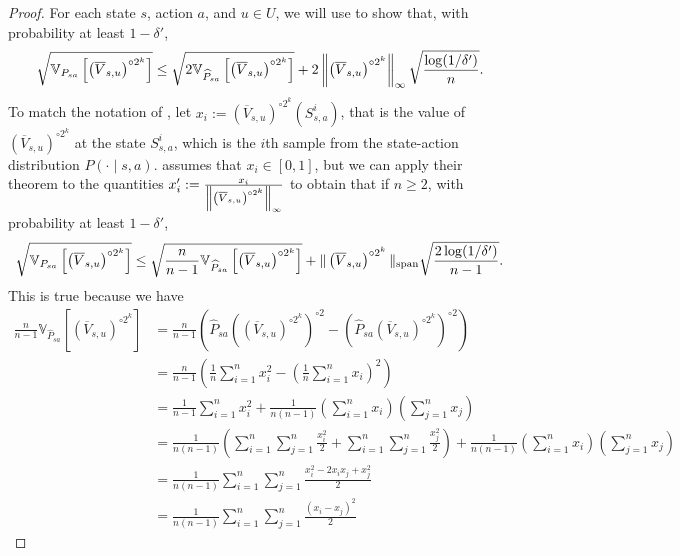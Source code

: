 \documentclass{article}
\theoremstyle{plain}
\theoremstyle{plain}
\theoremstyle{remark}
\theoremstyle{plain}
\theoremstyle{plain}
\newcommand{\Var}{\mathbb{V}}
\newcommand{\Phat}{\widehat{P}}
\newcommand{\Vc}{\overline{V}}
\begin{document}
\begin{proof}
For each state $s$, action $a$, and $u \in U$, we will use \cite[Theorem 10]{maurer_empirical_2009} to show that, with probability at least $1 - \delta'$,
\begin{align}
        \sqrt{\Var_{P_{sa}} \left[ \left(\Vc_{s,u} \right)^{\circ 2^k} \right] }\leq \sqrt{2 \Var_{\Phat_{sa}} \left[ \left(\Vc_{s,u} \right)^{\circ 2^k} \right] } + 2 \infnorm{\left(\Vc_{s,u} \right)^{\circ 2^k}}\sqrt{\frac{\log (1/\delta')}{n}}. \label{eq:maurer_empirical_conclusion}
\end{align}
To match the notation of \cite[Theorem 10]{maurer_empirical_2009}, let $x_i := \left(\Vc_{s,u} \right)^{\circ 2^k}(S^i_{s,a})$, that is the value of $\left(\Vc_{s,u} \right)^{\circ 2^k}$ at the state $S^i_{s,a}$, which is the $i$th sample from the state-action distribution $P(\cdot \mid s,a)$. \cite[Theorem 10]{maurer_empirical_2009} assumes that $x_i \in [0,1]$, but we can apply their theorem to the quantities $x_i' := \frac{x_i}{\infnorm{\left(\Vc_{s,u} \right)^{\circ 2^k}}}$ to obtain that if $n \geq 2$, with probability at least $1-\delta'$,
\begin{align*}
        \sqrt{\Var_{P_{sa}} \left[ \left(\Vc_{s,u} \right)^{\circ 2^k} \right] }\leq \sqrt{\frac{n}{n-1} \Var_{\Phat_{sa}} \left[ \left(\Vc_{s,u} \right)^{\circ 2^k} \right] } +  \spannorm{\left(\Vc_{s,u} \right)^{\circ 2^k}}\sqrt{\frac{2\log (1/\delta')}{n-1}}.
\end{align*}
This is true because we have
\begin{align*}
    \frac{n}{n-1} \Var_{\Phat_{sa}} \left[ \left(\Vc_{s,u} \right)^{\circ 2^k} \right] &= \frac{n}{n-1} \left(\Phat_{sa} \left( \left(\Vc_{s,u} \right)^{\circ 2^k}\right)^{\circ 2}  - \left( \Phat_{sa} \left(\Vc_{s,u} \right)^{\circ 2^k} \right)^{\circ 2} \right) \\
    &= \frac{n}{n-1} \left( \frac{1}{n} \sum_{i=1}^n x_i^2 - \left(\frac{1}{n} \sum_{i=1}^n x_i \right)^2 \right) \\
    &=\frac{1}{n-1} \sum_{i=1}^n x_i^2 + \frac{1}{n(n-1)}\left(\sum_{i=1}^n x_i \right) \left(\sum_{j=1}^n x_j \right) \\
    &= \frac{1}{n(n-1)} \left(\sum_{i=1}^n\sum_{j=1}^n \frac{x_i^2}{2} + \sum_{i=1}^n\sum_{j=1}^n \frac{x_j^2}{2} \right) + \frac{1}{n(n-1)}\left(\sum_{i=1}^n x_i \right) \left(\sum_{j=1}^n x_j \right) \\
    &= \frac{1}{n(n-1)} \sum_{i=1}^n \sum_{j=1}^n \frac{x_i^2 - 2x_i x_j + x_j^2}{2} \\
    &= \frac{1}{n(n-1)} \sum_{i=1}^n \sum_{j=1}^n \frac{(x_i - x_j)^2}{2}

\end{align*}
\end{proof}
\end{document}
